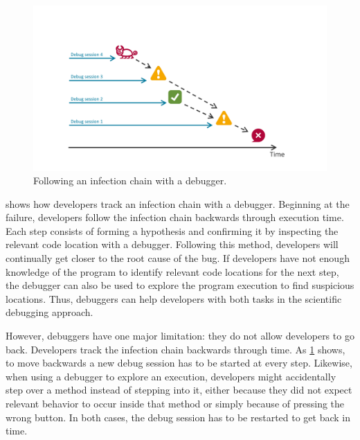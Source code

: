 \begin{figure}[th]
\centering
\includegraphics[width=.9\linewidth]{img/workflow-traditional}
\caption{Following an infection chain with a debugger.}
\label{fig:workflow-traditional}
\end{figure}

 shows how developers track an infection chain with a debugger.
Beginning at the failure, developers follow the infection chain backwards through execution time.
Each step consists of forming a hypothesis and confirming it by inspecting the relevant code location with a debugger. 
Following this method, developers will continually get closer to the root cause of the bug.
If developers have not enough knowledge of the program to identify relevant code locations for the next step, the debugger can also be used to explore the program execution to find suspicious locations.
Thus, debuggers can help developers with both tasks in the scientific debugging approach.

However, debuggers have one major limitation: they do not allow developers to go back.
Developers track the infection chain backwards through time.
As \cref{fig:workflow-traditional} shows, to move backwards a new debug session has to be started at every step.
Likewise, when using a debugger to explore an execution, developers might accidentally step over a method instead of stepping into it, either because they did not expect relevant behavior to occur inside that method or simply because of pressing the wrong button.
In both cases, the debug session has to be restarted to get back in time.

